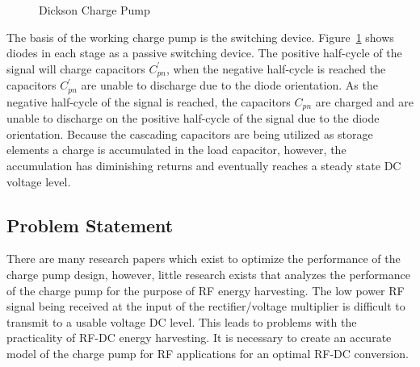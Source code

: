 \documentclass[12pt]{article}
\begin{document}
\begin{figure}[H]
\caption{Dickson Charge Pump \cite{Guler}}
\label{fig:DicksonCP}
\end{figure}

\noindent The basis of the working charge pump is the switching device. Figure~\ref{fig:DicksonCP} shows diodes in each stage as a passive switching device. The positive half-cycle of the signal will charge capacitors $C^{'}_{pn}$, when the negative half-cycle is reached the capacitors $C^{'}_{pn}$ are unable to discharge due to the diode orientation. As the negative half-cycle of the signal is reached, the capacitors $C_{pn}$ are charged and are unable to discharge on the positive half-cycle of the signal due to the diode orientation. Because the cascading capacitors are being utilized as storage elements a charge is accumulated in the load capacitor, however, the accumulation has diminishing returns and eventually reaches a steady state DC voltage level.\\

\subsection{Problem Statement}
There are many research papers which exist to optimize the performance of the charge pump design, however, little research exists that analyzes the performance of the charge pump for the purpose of RF energy harvesting. The low power RF signal being received at the input of the rectifier/voltage multiplier is difficult to transmit to a usable voltage DC level. This leads to problems with the practicality of RF-DC energy harvesting. It is necessary to create an accurate model of the charge pump for RF applications for an optimal RF-DC conversion.
\end{document}
